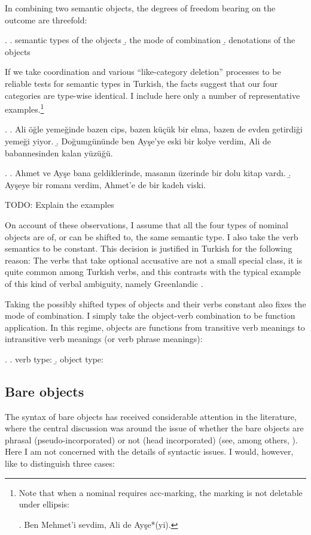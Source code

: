 \documentclass[11pt,a4paper]{article}
\begin{document}
In combining two semantic objects, the degrees of freedom bearing on the
outcome are threefold:

\ex.
\a. semantic types of the objects
\b. the mode of combination
\b. denotations of the objects

If we take coordination and various ``like-category deletion'' processes to be
reliable tests for semantic types in Turkish, the facts suggest that our four
categories are type-wise identical. I include here only a number of
representative examples.\footnote{Note that when a nominal requires
acc-marking, the marking is not deletable under ellipsis:

\ex. Ben Mehmet'i sevdim, Ali de Ayşe*(yi).

}

\ex.
\a. Ali öğle yemeğinde bazen cips, bazen küçük bir elma, bazen de evden getirdiği yemeği yiyor. 
\b. Doğumgününde ben Ayşe'ye eski bir kolye verdim, Ali de babannesinden kalan yüzüğü. 

\ex.
\a. Ahmet ve Ayşe bana geldiklerinde, masanın üzerinde bir dolu kitap vardı.
\b.\label{typeell} Ayşeye bir romanı verdim, Ahmet'e de bir kadeh viski.

TODO: Explain the examples

On account of these observations, I assume that all the four types of nominal
objects are of, or can be shifted to, the same semantic type. I also take the
verb semantics to be constant. This decision is justified in Turkish for the
following reason: The verbs that take optional accusative are not a small
special class, it is quite common among Turkish verbs, and this contrasts with
the typical example of this kind of verbal ambiguity, namely Greenlandic
.

Taking the possibly shifted types of objects and their verbs constant also
fixes the mode of combination. I simply take the object-verb combination to be
function application. In this regime, objects are functions from transitive
verb meanings to intransitive verb meanings (or verb phrase meanings):

\ex.
\a. verb type:  
\b. object type:  

\subsection{Bare objects}

The syntax of bare objects has received considerable attention in the
literature, where the central discussion was around the issue of whether the
bare objects are phrasal (pseudo-incorporated) or not (head incorporated) (see,
among others,
).
Here I am not concerned with the details of syntactic issues. I would, however,
like to distinguish three cases:
\end{document}

